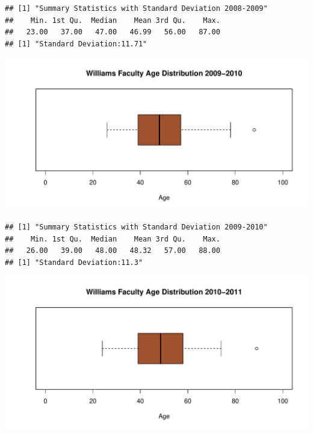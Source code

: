 \documentclass[12pt,a4paper]{article}\usepackage[]{graphicx}\usepackage[]{color}
\makeatletter
\def\maxwidth{ %
  \ifdim\Gin@nat@width>\linewidth
    \linewidth
  \else
    \Gin@nat@width
  \fi
}
\newenvironment{kframe}{%
 \def\at@end@of@kframe{}%
 \ifinner\ifhmode%
  \def\at@end@of@kframe{\end{minipage}}%
  \begin{minipage}{\columnwidth}%
 \fi\fi%
 \def\FrameCommand##1{\hskip\@totalleftmargin \hskip-\fboxsep
 \colorbox{shadecolor}{##1}\hskip-\fboxsep
     \hskip-\linewidth \hskip-\@totalleftmargin \hskip\columnwidth}%
 \MakeFramed {\advance\hsize-\width
   \@totalleftmargin\z@ \linewidth\hsize
   \@setminipage}}%
 {\par\unskip\endMakeFramed%
 \at@end@of@kframe}
\newenvironment{knitrout}{}{} %
\theoremstyle{definition}
\makeatother
\begin{document}
\begin{knitrout}
\color{fgcolor}\begin{kframe}
\begin{verbatim}
## [1] "Summary Statistics with Standard Deviation 2008-2009"
##    Min. 1st Qu.  Median    Mean 3rd Qu.    Max. 
##   23.00   37.00   47.00   46.99   56.00   87.00
## [1] "Standard Deviation:11.71"
\end{verbatim}
\end{kframe}
\end{knitrout}

\begin{knitrout}
\color{fgcolor}
\includegraphics[width=\maxwidth]{figure/unnamed-chunk-23-1} 

\end{knitrout}

\begin{knitrout}
\color{fgcolor}\begin{kframe}
\begin{verbatim}
## [1] "Summary Statistics with Standard Deviation 2009-2010"
##    Min. 1st Qu.  Median    Mean 3rd Qu.    Max. 
##   26.00   39.00   48.00   48.32   57.00   88.00
## [1] "Standard Deviation:11.3"
\end{verbatim}
\end{kframe}
\end{knitrout}


\begin{knitrout}
\color{fgcolor}
\includegraphics[width=\maxwidth]{figure/unnamed-chunk-25-1} 

\end{knitrout}
\end{document}
